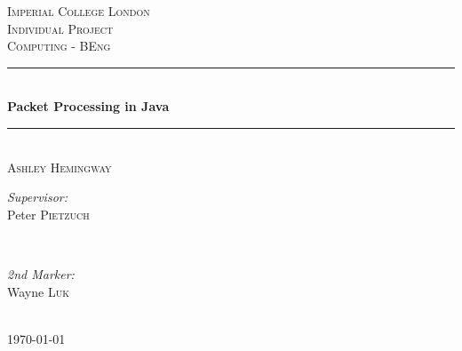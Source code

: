\documentclass[interim_report.tex]{subfiles}
\begin{document}
\begin{titlepage}

\newcommand{\HRule}{\rule{\linewidth}{0.5mm}}

\center

\textsc{\LARGE Imperial College London}\\[1.5cm]
\textsc{\Large Individual Project}\\[0.5cm]
\textsc{\large Computing - BEng}\\[0.5cm]

\HRule \\[0.6cm]
{ \huge \bfseries Packet Processing in Java}\\[0.4cm]
\HRule \\[1.5cm]

\textsc{\LARGE Ashley Hemingway}\\[1.5cm]

\begin{minipage}{0.4\textwidth}
\begin{flushleft} \large
\emph{Supervisor:}\\
Peter \textsc{Pietzuch}
\end{flushleft}
\end{minipage}
~
\begin{minipage}{0.4\textwidth}
\begin{flushright} \large
\emph{2nd Marker:} \\
Wayne \textsc{Luk}
\end{flushright}
\end{minipage}\\[4cm]

{\large \monthyeardate\today}\\[3cm]


\vfill

\end{titlepage}
\end{document}
